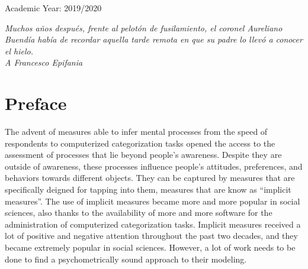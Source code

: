 \documentclass[12pt]{book}
\begin{document}
\begin{center}
	Academic Year: 2019/2020
\end{center}


\newpage


\vspace*{5cm}
\thispagestyle{empty}

\begin{multicols}{2}
	\vspace*{\textheight}
	\columnbreak
	\begin{flushright}
		\slshape \onehalfspacing
		Muchos años después, frente al pelotón de fusilamiento, el coronel Aureliano Buendía había de recordar aquella tarde remota en que su padre lo llevó a conocer el hielo.
		\\ \vspace{2cm} A Francesco Epifania
	\end{flushright}
	
\end{multicols}


\frontmatter


\tableofcontents

\newpage



\chapter{Preface} \label{chap:preface}

The advent of measures able to infer mental processes from the speed of respondents to computerized categorization tasks opened the access to the assessment of processes that lie beyond people's awareness.  
Despite they are outside of awareness, these processes influence people's attitudes, preferences, and behaviors towards different objects. 
They can be captured by measures that are specifically deigned for tapping into them, measures that are know as ``implicit measures''. The use of implicit measures became more and more popular in social sciences, also thanks to the availability of more and more software for the administration of computerized categorization tasks.
Implicit measures received a lot of positive and negative attention throughout the past two decades, and they became extremely popular in social sciences. However, a lot of work needs to be done to find a psychometrically sound approach to their modeling.
\end{document}
